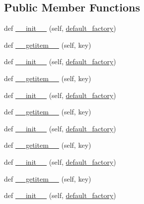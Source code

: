 \subsection*{Public Member Functions}
\begin{DoxyCompactItemize}
\item 
def \hyperlink{classwaflib_1_1_utils_1_1defaultdict_a968729f577547834856268565a96ba06}{\+\_\+\+\_\+init\+\_\+\+\_\+} (self, \hyperlink{classwaflib_1_1_utils_1_1defaultdict_a9e85c1cdac164d19405cbcc3a1fdb9cb}{default\+\_\+factory})
\item 
def \hyperlink{classwaflib_1_1_utils_1_1defaultdict_a4c0078abd149716b1d7d2fbfba00c84c}{\+\_\+\+\_\+getitem\+\_\+\+\_\+} (self, key)
\item 
def \hyperlink{classwaflib_1_1_utils_1_1defaultdict_a968729f577547834856268565a96ba06}{\+\_\+\+\_\+init\+\_\+\+\_\+} (self, \hyperlink{classwaflib_1_1_utils_1_1defaultdict_a9e85c1cdac164d19405cbcc3a1fdb9cb}{default\+\_\+factory})
\item 
def \hyperlink{classwaflib_1_1_utils_1_1defaultdict_a4c0078abd149716b1d7d2fbfba00c84c}{\+\_\+\+\_\+getitem\+\_\+\+\_\+} (self, key)
\item 
def \hyperlink{classwaflib_1_1_utils_1_1defaultdict_a968729f577547834856268565a96ba06}{\+\_\+\+\_\+init\+\_\+\+\_\+} (self, \hyperlink{classwaflib_1_1_utils_1_1defaultdict_a9e85c1cdac164d19405cbcc3a1fdb9cb}{default\+\_\+factory})
\item 
def \hyperlink{classwaflib_1_1_utils_1_1defaultdict_a4c0078abd149716b1d7d2fbfba00c84c}{\+\_\+\+\_\+getitem\+\_\+\+\_\+} (self, key)
\item 
def \hyperlink{classwaflib_1_1_utils_1_1defaultdict_a968729f577547834856268565a96ba06}{\+\_\+\+\_\+init\+\_\+\+\_\+} (self, \hyperlink{classwaflib_1_1_utils_1_1defaultdict_a9e85c1cdac164d19405cbcc3a1fdb9cb}{default\+\_\+factory})
\item 
def \hyperlink{classwaflib_1_1_utils_1_1defaultdict_a4c0078abd149716b1d7d2fbfba00c84c}{\+\_\+\+\_\+getitem\+\_\+\+\_\+} (self, key)
\item 
def \hyperlink{classwaflib_1_1_utils_1_1defaultdict_a968729f577547834856268565a96ba06}{\+\_\+\+\_\+init\+\_\+\+\_\+} (self, \hyperlink{classwaflib_1_1_utils_1_1defaultdict_a9e85c1cdac164d19405cbcc3a1fdb9cb}{default\+\_\+factory})
\item 
def \hyperlink{classwaflib_1_1_utils_1_1defaultdict_a4c0078abd149716b1d7d2fbfba00c84c}{\+\_\+\+\_\+getitem\+\_\+\+\_\+} (self, key)
\item 
def \hyperlink{classwaflib_1_1_utils_1_1defaultdict_a968729f577547834856268565a96ba06}{\+\_\+\+\_\+init\+\_\+\+\_\+} (self, \hyperlink{classwaflib_1_1_utils_1_1defaultdict_a9e85c1cdac164d19405cbcc3a1fdb9cb}{default\+\_\+factory})

\end{DoxyCompactItemize}
